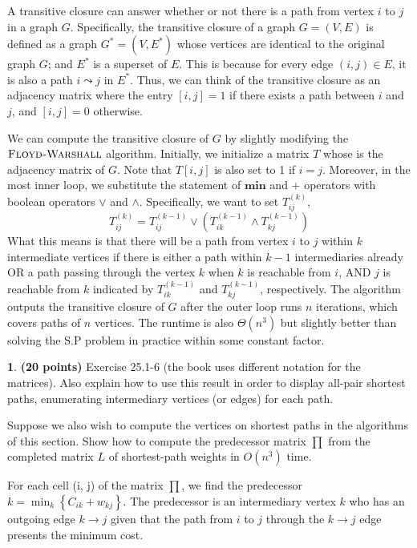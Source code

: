 \documentclass[11pt]{article}
\theoremstyle{definition}
\theoremstyle{theorem}
\newtheorem{prob}{}
\newcommand{\solution}{\medskip\noindent{\color{DarkBlue}\textbf{Solution:}}}
\begin{document}
A transitive closure can answer whether or not there is a path from vertex $i$ to $j$ in a graph $G$. Specifically, the transitive closure of a graph $G = (V, E)$ is defined as a graph $G^* = (V, E^*)$ whose vertices are identical to the original graph $G$; and $E^*$ is a superset of $E$. This is because for every edge $(i, j) \in E$, it is also a path $i \leadsto j$ in $E^*$. Thus, we can think of the transitive closure as an adjacency matrix where the entry $[i, j] = 1$ if there exists a path between $i$ and $j$, and $[i, j] = 0$ otherwise.

We can compute the transitive closure of $G$ by slightly modifying the $\textproc{\textsc{Floyd-Warshall}}$ algorithm. Initially, we initialize a matrix $T$ whose is the adjacency matrix of $G$. Note that $T[i, j]$ is also set to 1 if $i = j$.
Moreover, in the most inner loop, we substitute the statement of $\textbf{min}$ and $\textbf{+}$ operators with boolean operators $\lor$ and $\land$. Specifically, we want to set $T_{ij}^{(k)}$,
\[
T_{ij}^{(k)} = T_{ij}^{(k-1)} \lor (T_{ik}^{(k-1)} \land T_{kj}^{(k-1)})
\]
What this means is that there will be a path from vertex $i$ to $j$ within $k$ intermediate vertices if there is either a path within $k - 1$ intermediaries already OR a path passing through the vertex $k$ when $k$ is reachable from $i$, AND $j$ is reachable from $k$ indicated by $T_{ik}^{(k-1)}$ and $T_{kj}^{(k-1)}$, respectively. The algorithm outputs the transitive closure of $G$ after the outer loop runs $n$ iterations, which covers paths of $n$ vertices. The runtime is also $\Theta{(n^3)}$ but slightly better than solving the S.P problem in practice within some constant factor. 

\newpage
\begin{prob} \textbf{(20 points)} 
Exercise  25.1-6  (the  book  uses  different  notation  for  the  matrices).   Also explain how to use this result in order to display all-pair shortest paths, enumerating intermediary vertices (or edges) for each path.
\end{prob}

Suppose we also wish to compute the vertices on shortest paths in the algorithms of this section. Show how to compute the predecessor matrix $\prod$ from the completed matrix $L$ of shortest-path weights in $O(n^3)$ time.

\solution

For each cell (i, j) of the matrix $\prod$, we find the predecessor $k = \min_k \left\{ C_{ik} + w_{kj}\right\}$. The predecessor is an intermediary vertex $k$ who has an outgoing edge $k \rightarrow j$ given that the path from $i$ to $j$ through the $k \rightarrow j$ edge presents the minimum cost. 
\end{document}
